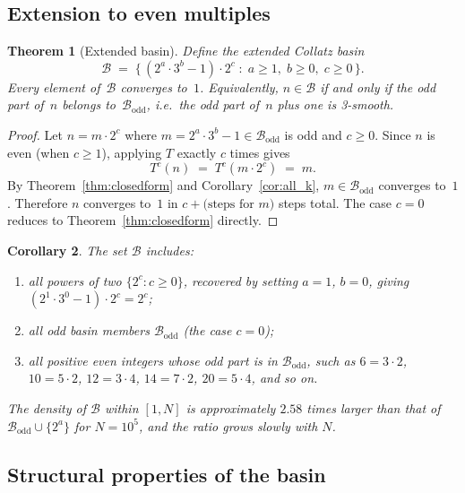 \documentclass[12pt]{amsart}
\newtheorem{theorem}{Theorem}[section]
\newtheorem{corollary}[theorem]{Corollary}
\theoremstyle{definition}
\newcommand{\basin}{\mathcal{B}}
\begin{document}
\subsection{Extension to even multiples}

\begin{theorem}[Extended basin]\label{thm:extended}
  Define the \emph{extended Collatz basin}
  \[
    \basin
    \;=\;
    \bigl\{\, (2^a \cdot 3^b - 1) \cdot 2^c
    \;:\; a \geq 1,\; b \geq 0,\; c \geq 0 \,\bigr\}.
  \]
  Every element of~$\basin$ converges to~$1$.
  Equivalently, $n \in \basin$ if and only if the odd part of~$n$ belongs
  to~$\basin_{\mathrm{odd}}$, i.e.\ the odd part of~$n$ plus one is
  3-smooth.
\end{theorem}

\begin{proof}
  Let $n = m \cdot 2^c$ where $m = 2^a \cdot 3^b - 1 \in \basin_{\mathrm{odd}}$
  is odd and $c \geq 0$.
  Since $n$ is even (when $c \geq 1$), applying $T$ exactly $c$ times gives
  \[
    T^c(n) \;=\; T^c(m \cdot 2^c) \;=\; m.
  \]
  By Theorem~\ref{thm:closedform} and Corollary~\ref{cor:all_k},
  $m \in \basin_{\mathrm{odd}}$ converges to~$1$.
  Therefore $n$ converges to~$1$ in $c + \text{(steps for } m\text{)}$
  steps total.
  The case $c = 0$ reduces to Theorem~\ref{thm:closedform} directly.
\end{proof}

\begin{corollary}
  The set $\basin$ includes:
  \begin{enumerate}[label=(\roman*)]
    \item all powers of two $\{2^c : c \geq 0\}$, recovered by setting
          $a = 1$, $b = 0$, giving $(2^1 \cdot 3^0 - 1) \cdot 2^c = 2^c$;
    \item all odd basin members $\basin_{\mathrm{odd}}$ (the case $c = 0$);
    \item all positive even integers whose odd part is in $\basin_{\mathrm{odd}}$,
          such as $6 = 3 \cdot 2$, $10 = 5 \cdot 2$, $12 = 3 \cdot 4$,
          $14 = 7 \cdot 2$, $20 = 5 \cdot 4$, and so on.
  \end{enumerate}
  The density of $\basin$ within $[1,N]$ is approximately $2.58$ times
  larger than that of $\basin_{\mathrm{odd}} \cup \{2^a\}$ for $N = 10^5$,
  and the ratio grows slowly with $N$.
\end{corollary}

\subsection{Structural properties of the basin}
\end{document}

